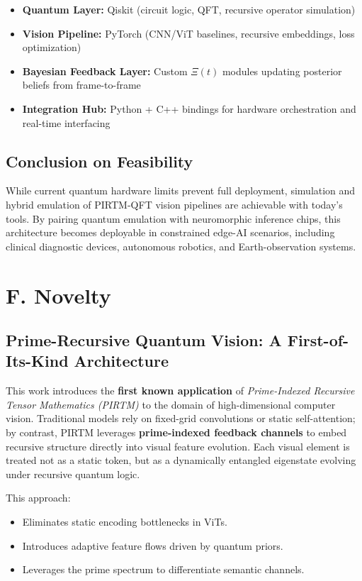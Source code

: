 \documentclass[12pt]{article}
\theoremstyle{plain}
\begin{document}
\begin{itemize}
    \item \textbf{Quantum Layer:} Qiskit (circuit logic, QFT, recursive operator simulation)
    \item \textbf{Vision Pipeline:} PyTorch (CNN/ViT baselines, recursive embeddings, loss optimization)
    \item \textbf{Bayesian Feedback Layer:} Custom $\Xi(t)$ modules updating posterior beliefs from frame-to-frame
    \item \textbf{Integration Hub:} Python + C++ bindings for hardware orchestration and real-time interfacing
\end{itemize}

\subsection*{Conclusion on Feasibility}

While current quantum hardware limits prevent full deployment, simulation and hybrid emulation of PIRTM-QFT vision pipelines are achievable with today's tools. By pairing quantum emulation with neuromorphic inference chips, this architecture becomes deployable in constrained edge-AI scenarios, including clinical diagnostic devices, autonomous robotics, and Earth-observation systems.

\section*{F. Novelty}

\subsection*{Prime-Recursive Quantum Vision: A First-of-Its-Kind Architecture}

This work introduces the \textbf{first known application} of \textit{Prime-Indexed Recursive Tensor Mathematics (PIRTM)} to the domain of high-dimensional computer vision. Traditional models rely on fixed-grid convolutions or static self-attention; by contrast, PIRTM leverages \textbf{prime-indexed feedback channels} to embed recursive structure directly into visual feature evolution. Each visual element is treated not as a static token, but as a dynamically entangled eigenstate evolving under recursive quantum logic.

This approach:
\begin{itemize}
    \item Eliminates static encoding bottlenecks in ViTs.
    \item Introduces adaptive feature flows driven by quantum priors.
    \item Leverages the prime spectrum to differentiate semantic channels.
\end{itemize}
\end{document}
